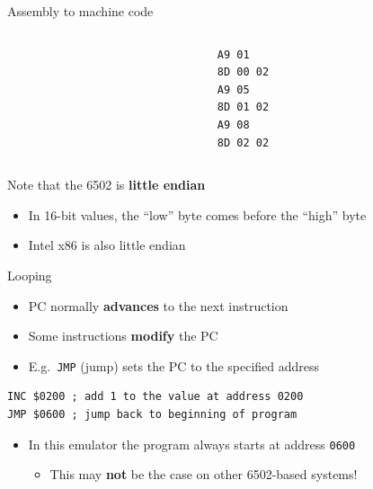 \begin{frame}[fragile]{Assembly to machine code}
	\begin{columns}
		\begin{column}{0.48\textwidth}
			\pause
		\end{column}
		\begin{column}{0.48\textwidth}
			\pause
			\begin{lstlisting}
A9 01
8D 00 02
A9 05
8D 01 02
A9 08
8D 02 02
			\end{lstlisting}
		\end{column}
	\end{columns}
	\pause Note that the 6502 is \textbf{little endian}
	\begin{itemize}
		\pause\item In 16-bit values, the ``low'' byte comes before the ``high'' byte
		\pause\item Intel x86 is also little endian
	\end{itemize}
\end{frame}

\begin{frame}[fragile]{Looping}
	\begin{itemize}
		\pause\item PC normally \textbf{advances} to the next instruction
		\pause\item Some instructions \textbf{modify} the PC
		\pause\item E.g.\ \lstinline{JMP} (jump) sets the PC to the specified address
	\end{itemize}
	\pause
	\begin{lstlisting}
INC $0200 ; add 1 to the value at address 0200
JMP $0600 ; jump back to beginning of program
	\end{lstlisting}
	\begin{itemize}
		\pause\item In this emulator the program always starts at address \texttt{0600}
			\begin{itemize}
				\item This may \textbf{not} be the case on other 6502-based systems!
			\end{itemize}
	\end{itemize}
\end{frame}

